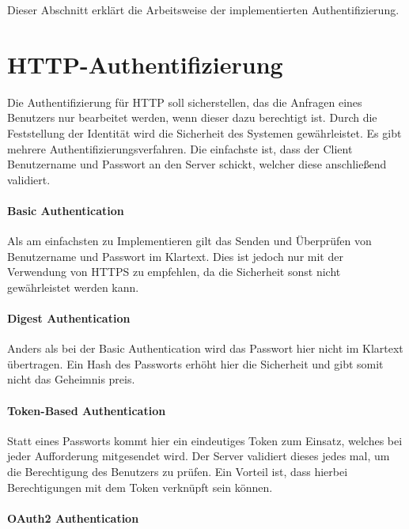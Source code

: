 Dieser Abschnitt erklärt die Arbeitsweise der implementierten Authentifizierung.

\section{HTTP-Authentifizierung}
Die Authentifizierung für HTTP soll sicherstellen, das die Anfragen eines Benutzers nur bearbeitet werden, wenn dieser dazu berechtigt ist. 
Durch die Feststellung der Identität wird die Sicherheit des Systemen gewährleistet. 
Es gibt mehrere Authentifizierungsverfahren. 
Die einfachste ist, dass der Client Benutzername und Passwort an den Server schickt, welcher diese anschließend validiert.

\paragraph{Basic Authentication}

Als am einfachsten zu Implementieren gilt das Senden und Überprüfen von Benutzername und Passwort im Klartext. 
Dies ist jedoch nur mit der Verwendung von HTTPS zu empfehlen, da die Sicherheit sonst nicht gewährleistet werden kann.

\paragraph{Digest Authentication}

Anders als bei der Basic Authentication wird das Passwort hier nicht im Klartext übertragen. 
Ein Hash des Passworts erhöht hier die Sicherheit und gibt somit nicht das Geheimnis preis.

\paragraph{Token-Based Authentication}

Statt eines Passworts kommt hier ein eindeutiges Token zum Einsatz, welches bei jeder Aufforderung mitgesendet wird. 
Der Server validiert dieses jedes mal, um die Berechtigung des Benutzers zu prüfen.
Ein Vorteil ist, dass hierbei Berechtigungen mit dem Token verknüpft sein können.

\paragraph{OAuth2 Authentication}

